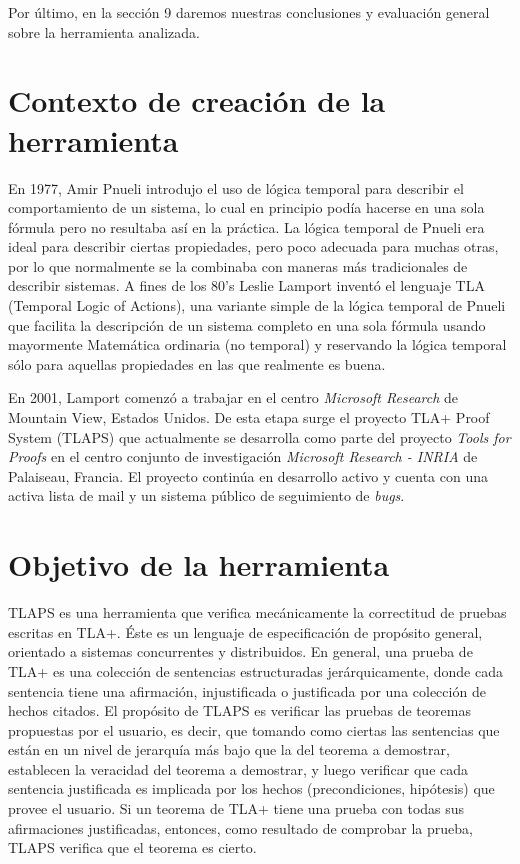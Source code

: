\documentclass[spanish]{llncs}
\begin{document}
Por último, en la sección 9 daremos nuestras conclusiones y evaluación general sobre la herramienta analizada.

\section{Contexto de creación de la herramienta}

 En 1977, Amir Pnueli introdujo el uso de lógica temporal para describir el comportamiento de un sistema, lo cual en principio podía hacerse en una sola fórmula pero no resultaba así en la práctica. La lógica temporal de Pnueli era ideal para describir ciertas propiedades, pero poco adecuada para muchas otras, por lo que normalmente se la combinaba con maneras más tradicionales de describir sistemas. \cite{pnueli} A fines de los 80's Leslie Lamport inventó el lenguaje TLA (Temporal Logic of Actions), una variante simple de la lógica temporal de Pnueli que facilita la descripción de un sistema completo en una sola fórmula usando mayormente Matemática ordinaria (no temporal) y reservando la lógica temporal sólo para aquellas propiedades en las que realmente es buena. \cite{specsys}
 
 En 2001, Lamport comenzó a trabajar en el centro \textit{Microsoft Research} de Mountain View, Estados Unidos. De esta etapa surge el proyecto TLA+ Proof System (TLAPS) que actualmente se desarrolla como parte del proyecto \textit{Tools for Proofs} en el centro conjunto de investigación \textit{Microsoft Research - INRIA} de Palaiseau, Francia. 
 El proyecto continúa en desarrollo activo y cuenta con una activa lista de mail y un sistema público de seguimiento de \textit{bugs}.



\section{Objetivo de la herramienta}

TLAPS es una herramienta que verifica mecánicamente la correctitud de pruebas escritas en TLA+.
Éste es un lenguaje de especificación de propósito general, orientado a sistemas concurrentes y distribuidos\cite{highlevel}.
En general, una prueba de TLA+ es una colección de sentencias estructuradas jerárquicamente,
donde cada sentencia tiene una afirmación, injustificada o justificada por una colección de hechos citados.
El propósito de TLAPS es verificar las pruebas de teoremas propuestas por el usuario, es decir, que tomando como ciertas las sentencias que están en un nivel de jerarquía más bajo que la del teorema a demostrar, establecen la veracidad del teorema a demostrar, y luego verificar que cada sentencia justificada es implicada por los hechos (precondiciones, hipótesis) que provee el usuario\cite{tlaps}.
Si un teorema de TLA+ tiene una prueba con todas sus afirmaciones justificadas, entonces, como resultado
de comprobar la prueba, TLAPS verifica que el teorema es cierto.
\end{document}
